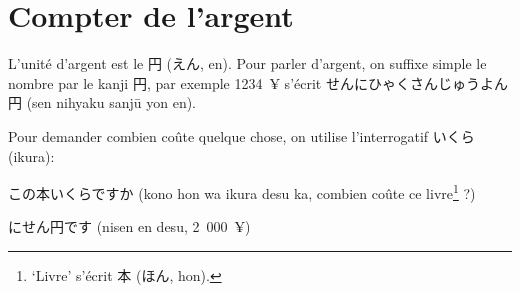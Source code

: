 \documentclass[a4paper,10pt,french,openany]{memoir}
\begin{document}
\section{Compter de l'argent}

L'unité d'argent est le 円 (えん, en). Pour parler d'argent, on suffixe simple le nombre par le kanji 円, par exemple 1234~¥ s'écrit せんにひゃくさんじゅうよん円 (sen nihyaku sanjū yon en).

Pour demander combien coûte quelque chose, on utilise l'interrogatif いくら (ikura):
\begin{cquote}{}
 この本いくらですか (kono hon wa ikura desu ka, combien coûte ce livre\footnote{`Livre' s'écrit 本 (ほん, hon).} ?)
  
 にせん円です (nisen en desu, 2~000~¥)
\end{cquote}
\end{document}
